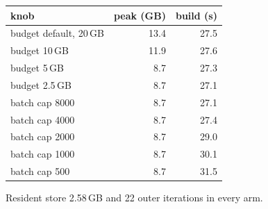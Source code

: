 {\small
\begin{tabular}{lrr}
\toprule
knob & peak (GB) & build (s) \\
\midrule
budget default, 20\,GB & 13.4 & 27.5 \\
budget 10\,GB & 11.9 & 27.6 \\
budget 5\,GB & 8.7 & 27.3 \\
budget 2.5\,GB & 8.7 & 27.1 \\
\midrule
batch cap 8000 & 8.7 & 27.1 \\
batch cap 4000 & 8.7 & 27.4 \\
batch cap 2000 & 8.7 & 29.0 \\
batch cap 1000 & 8.7 & 30.1 \\
batch cap 500 & 8.7 & 31.5 \\
\bottomrule
\end{tabular}
\par\smallskip
{\footnotesize Resident store 2.58\,GB and 22 outer iterations in every arm.}
}
